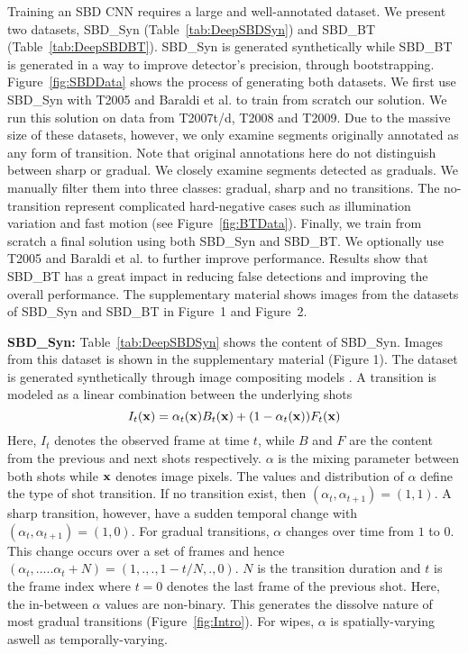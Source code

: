 \documentclass[journal]{IEEEtran}
\begin{document}
Training an SBD CNN requires a large and well-annotated dataset. We present two datasets, SBD\_Syn (Table~\ref{tab:DeepSBDSyn}) and SBD\_BT (Table~\ref{tab:DeepSBDBT}). SBD\_Syn is generated synthetically while SBD\_BT is generated in a way to improve detector's precision, through bootstrapping. Figure~\ref{fig:SBDData} shows the process of generating both datasets. We first use SBD\_Syn with T2005 and Baraldi et al. to train from scratch our solution. We run this solution on data from T2007t/d, T2008 and T2009. Due to the massive size of these datasets, however, we only examine segments originally annotated as any form of transition. Note that original annotations here do not distinguish between sharp or gradual. We closely examine segments detected as graduals. We manually filter them into three classes: gradual, sharp and no transitions. The no-transition represent complicated hard-negative cases such as illumination variation and fast motion (see Figure~\ref{fig:BTData}). Finally, we train from scratch a final solution using both SBD\_Syn and SBD\_BT. We optionally use T2005 and Baraldi et al. to further improve performance. 
Results show that SBD\_BT has a great impact in reducing false detections and improving the overall performance. The supplementary material shows images from the datasets of SBD\_Syn and SBD\_BT in Figure~1 and Figure~2.   

\textbf{SBD\_Syn:} 
Table~\ref{tab:DeepSBDSyn} shows the content of SBD\_Syn. Images from this dataset is shown in the supplementary material (Figure 1). 
The dataset is generated synthetically through image compositing models \cite{Levin07}. A transition is modeled as a linear combination between the underlying shots 
\begin{equation}
I_t({\bf {x}}) = \alpha_t({\bf {x}})B_t({\bf {x}}) + (1-\alpha_t({\bf {x}}))F_t({\bf {x}})
\label{eq:DataGen}
\end{equation}
Here, $I_t$ denotes the observed frame at time $t$, while $B$ and $F$ are the content from the previous and next shots respectively. $\alpha$ is the mixing parameter between both shots while ${\bf {x}}$ denotes image pixels. The values and distribution of $\alpha$ define the type of shot transition. If no transition exist, then $(\alpha_t,\alpha_{t+1})=({1,1})$. A sharp transition, however, have a sudden temporal change with $(\alpha_t,\alpha_{t+1})=(1,0)$. For gradual transitions, $\alpha$ changes over time from $1$ to $0$. This change occurs over a set of frames and hence $(\alpha_t,.....\alpha_t+N)=(1,.,.,1-t/N,.,0)$. $N$ is the transition duration and $t$ is the frame index where $t=0$ denotes the last frame of the previous shot. Here, the in-between $\alpha$ values are non-binary. This generates the dissolve nature of most gradual transitions (Figure~\ref{fig:Intro}). For wipes, $\alpha$ is spatially-varying aswell as temporally-varying. 
\end{document}
